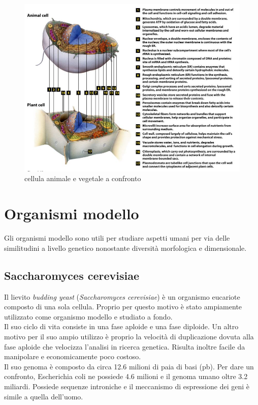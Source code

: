     \begin{figure}[h]
        \centering
        \includegraphics[width=1\textwidth]{images/schemagenerale.JPG}
        \caption{\small cellula animale e vegetale a confronto}
        \label{fig:mesh1}
    \end{figure}
    
\section{Organismi modello}
    Gli organismi modello sono utili per studiare aspetti umani per via delle similitudini a livello genetico nonostante diversità morfologica e dimensionale.
    \subsection{Saccharomyces cerevisiae}
        Il lievito \textit{budding yeast} (\textit{Saccharomyces cerevisiae}) è un organismo eucariote composto di una sola cellula. Proprio per questo motivo è stato ampiamente utilizzato come organismo modello e studiato a fondo. \\
        Il suo ciclo di vita consiste in una fase aploide e una fase diploide. Un altro motivo per il suo ampio utilizzo è proprio la velocità di duplicazione dovuta alla fase aploide che velocizza l'analisi in ricerca genetica. Risulta inoltre facile da manipolare e economicamente poco costoso. \\
        Il suo genoma è composto da circa 12.6 milioni di paia di basi (pb). Per dare un confronto, Escherichia coli ne possiede 4.6 milioni e il genoma umano oltre 3.2 miliardi. Possiede sequenze introniche e il meccanismo di espressione dei geni è simile a quella dell'uomo.
    
